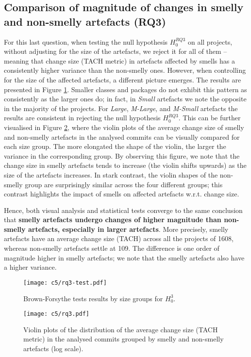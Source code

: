 \subsection{Comparison of magnitude of changes in smelly and non-smelly artefacts (RQ3)}
For this last question, when testing the null hypothesis $H^{RQ3}_0$ on all projects, without adjusting for the size of the artefacts, we reject it for all of them -- meaning that change size (TACH metric) in artefacts affected by smells has a consistently higher variance than the non-smelly ones.
However, when controlling for the size of the affected artefacts, a different picture emerges.
The results are presented in Figure \ref{c5:fig:rq3-test}. 
Smaller classes and packages do not exhibit this pattern as consistently as the larger ones do; in fact, in \emph{Small} artefacts we note the opposite in the majority of the projects.
For \emph{Large}, \emph{M-Large}, and \emph{M-Small} artefacts the results are consistent in rejecting the null hypothesis $H^{RQ3}_0$.
This can be further visualised in Figure \ref{c5:fig:rq3-violinplots}, where the violin plots of the average change size of smelly and non-smelly artefacts in the analysed commits can be visually compared for each size group. The more elongated the shape of the violin, the larger the variance in the corresponding group.
By observing this figure, we note that the change size in smelly artefacts tends to increase (the violin shifts upwards) as the size of the artefacts increases. In stark contrast, the violin shapes of the non-smelly group are surprisingly similar across the four different groups; this contrast highlights the impact of smells on affected artefacts w.r.t. change size. 

Hence, both visual analysis and statistical tests converge to the same conclusion that \textbf{smelly artefacts undergo changes of higher magnitude than non-smelly artefacts, especially in larger artefacts}.
More precisely, smelly artefacts have an average change size (TACH) across all the projects of 1608, whereas non-smelly artefacts settle at 109. The difference is one order of magnitude higher in smelly artefacts; we note that the smelly artefacts also have a higher variance.

\begin{figure}
    \centering
    \texttt{[image: c5/rq3-test.pdf]}
    \caption{Brown-Forsythe tests results by size groups for $H_0^3$.}\label{c5:fig:rq3-test}
\end{figure}

\begin{figure}
    \centering
    \texttt{[image: c5/rq3.pdf]}
    \caption{Violin plots of the distribution of the average change size (TACH metric) in the analysed commits grouped by  smelly and non-smelly artefacts (log scale).}\label{c5:fig:rq3-violinplots}
\end{figure}


